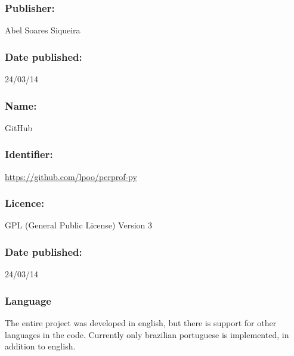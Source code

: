     \subsubsection*{Publisher:} Abel Soares Siqueira

    \subsubsection*{Date published:} 24/03/14

\CodeRepository

    \subsubsection*{Name:} GitHub

    \subsubsection*{Identifier:} \url{https://github.com/lpoo/perprof-py}

    \subsubsection*{Licence:} GPL (General Public License) Version 3

    \subsubsection*{Date published:} 24/03/14

\subsubsection*{Language}

    The entire project was developed in english, but there is support for
    other languages in the code. Currently only brazilian portuguese is
    implemented, in addition to english.

